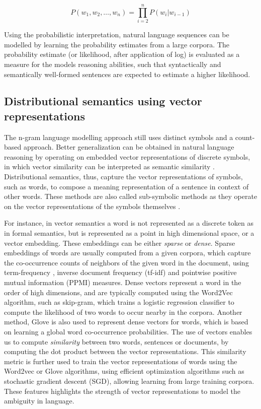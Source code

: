 \documentclass[letterpaper, 12pt]{report}
\begin{document}
\begin{equation}
  P(w_{1}, w_{2}, \ldots, w_{n}) = \prod_{i=2}^{n}P(w_{i}|w_{i-1})
\end{equation}

Using the probabilistic interpretation, natural language sequences can be modelled by learning the probability estimates from a large corpora. The probability estimate (or likelihood, after application of log) is evaluated as a measure for the models reasoning abilities, such that syntactically and semantically well-formed sentences are expected to estimate a higher likelihood.

\subsection{Distributional semantics using vector representations}
\label{sec:bg_distributional_semantics}

The n-gram language modelling approach still uses distinct symbols and a count-based approach.
Better generalization can be obtained in natural language reasoning by operating on embedded vector representations of discrete symbols, in which vector similarity can be interpreted as semantic similarity \citep{joos1950description,harris1954distributional,firth1957synopsis}. Distributional semantics, thus, capture the vector representations of symbols, such as words, to compose a meaning representation of a sentence in context of other words. These methods are also called sub-symbolic methods as they operate on the vector representations of the symbols themselves \citep{neelakantan2015compositional}.

For instance, in vector semantics a word is not represented as a discrete token as in formal semantics, but is represented as a point in high dimensional space, or a vector embedding. These embeddings can be either \textit{sparse} or \textit{dense}. Sparse embeddings of words are usually computed from a given corpora, which capture the co-occurrence counts of neighbors of the given word in the document, using term-frequency \citep{luhn1957statistical}, inverse document frequency \citep{jones1972statistical} (tf-idf) and pointwise positive mutual information (PPMI) \citep{fano1949transmission} measures. Dense vectors represent a word in the order of high dimensions, and are typically computed using the Word2Vec algorithm, such as skip-gram, which trains a logistic regression classifier to compute the likelihood of two words to occur nearby in the corpora. Another method, Glove \citep{pennington2014glove} is also used to represent dense vectors for words, which is based on learning a global word co-occurrence probabilities. The use of vectors enables us to compute \textit{similarity} between two words, sentences or documents, by computing the dot product between the vector representations. This similarity metric is further used to train the vector representations of words using the Word2vec \citep{mikolov2013efficient} or Glove \citep{pennington2014glove} algorithms, using efficient optimization algorithms such as stochastic gradient descent (SGD), allowing learning from large training corpora. These features highlights the strength of vector representations to model the ambiguity in language.
\end{document}

